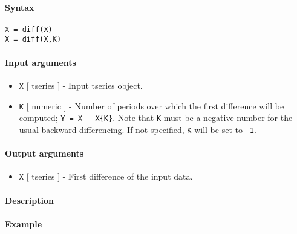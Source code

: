 


	\paragraph{Syntax}\label{syntax}

\begin{verbatim}
X = diff(X)
X = diff(X,K)
\end{verbatim}

\paragraph{Input arguments}\label{input-arguments}

\begin{itemize}
\item
  \texttt{X} {[} tseries {]} - Input tseries object.
\item
  \texttt{K} {[} numeric {]} - Number of periods over which the first
  difference will be computed; \texttt{Y = X - X\{K\}}. Note that
  \texttt{K} must be a negative number for the usual backward
  differencing. If not specified, \texttt{K} will be set to \texttt{-1}.
\end{itemize}

\paragraph{Output arguments}\label{output-arguments}

\begin{itemize}
\itemsep1pt\parskip0pt
\item
  \texttt{X} {[} tseries {]} - First difference of the input data.
\end{itemize}

\paragraph{Description}\label{description}

\paragraph{Example}\label{example}


